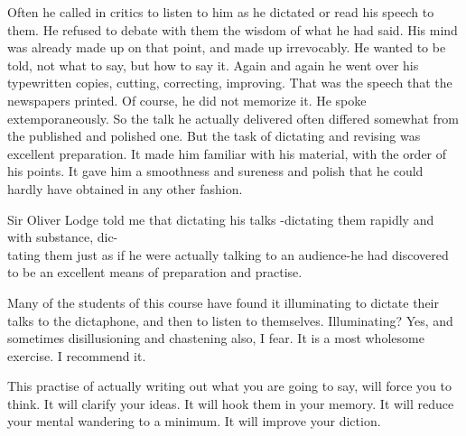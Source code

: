 \documentclass[10pt]{article}
\begin{document}
Often he called in critics to listen to him as he dictated or read his speech to them. He refused to debate with them the wisdom of what he had said. His mind was already made up on that point, and made up irrevocably. He wanted to be told, not what to say, but how to say it. Again and again he went over his typewritten copies, cutting, correcting, improving. That was the speech that the newspapers printed. Of course, he did not memorize it. He spoke extemporaneously. So the talk he actually delivered often differed somewhat from the published and polished one. But the task of dictating and revising was excellent preparation. It made him familiar with his material, with the order of his points. It gave him a smoothness and sureness and polish that he could hardly have obtained in any other fashion.

Sir Oliver Lodge told me that dictating his talks -dictating them rapidly and with substance, dic-\\
tating them just as if he were actually talking to an audience-he had discovered to be an excellent means of preparation and practise.

Many of the students of this course have found it illuminating to dictate their talks to the dictaphone, and then to listen to themselves. Illuminating? Yes, and sometimes disillusioning and chastening also, I fear. It is a most wholesome exercise. I recommend it.

This practise of actually writing out what you are going to say, will force you to think. It will clarify your ideas. It will hook them in your memory. It will reduce your mental wandering to a minimum. It will improve your diction.
\end{document}
